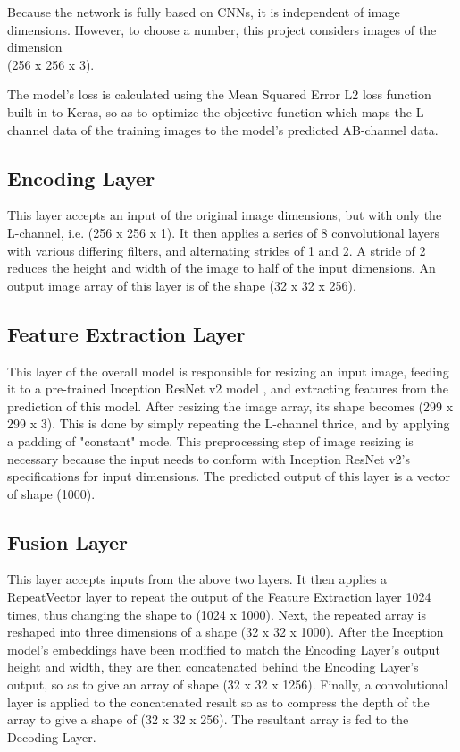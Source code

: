 \documentclass[10pt,twocolumn,letterpaper]{article}
\begin{document}
	Because the network is fully based on CNNs, it is independent of image dimensions. However, to choose a number, this project considers images of the dimension\\(256 x 256 x 3).

	The model's loss is calculated using the Mean Squared Error L2 loss function built in to Keras, so as to optimize the objective function which maps the L-channel data of the training images to the model's predicted AB-channel data.

	\subsection{Encoding Layer}
	This layer accepts an input of the original image dimensions, but with only the L-channel, i.e. (256 x 256 x 1). It then applies a series of 8 convolutional layers with various differing filters, and alternating strides of 1 and 2. A stride of 2 reduces the height and width of the image to half of the input dimensions. An output image array of this layer is of the shape (32 x 32 x 256).

	\subsection{Feature Extraction Layer}
	This layer of the overall model is responsible for resizing an input image, feeding it to a pre-trained Inception ResNet v2 model \cite{Inception}, and extracting features from the prediction of this model. After resizing the image array, its shape becomes (299 x 299 x 3). This is done by simply repeating the L-channel thrice, and by applying a padding of "constant" mode. This preprocessing step of image resizing is necessary because the input needs to conform with Inception ResNet v2's specifications for input dimensions. The predicted output of this layer is a vector of shape (1000).

	\subsection{Fusion Layer}
	This layer accepts inputs from the above two layers. It then applies a RepeatVector layer \cite{Keras} to repeat the output of the Feature Extraction layer 1024 times, thus changing the shape to (1024 x 1000). Next, the repeated array is reshaped into three dimensions of a shape (32 x 32 x 1000). After the Inception model's embeddings have been modified to match the Encoding Layer's output height and width, they are then concatenated behind the Encoding Layer's output, so as to give an array of shape (32 x 32 x 1256). Finally, a convolutional layer is applied to the concatenated result so as to compress the depth of the array to give a shape of (32 x 32 x 256). The resultant array is fed to the Decoding Layer.
\end{document}
